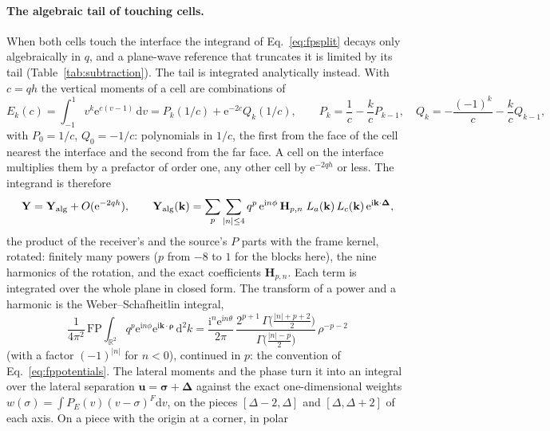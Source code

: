 \documentclass[11pt,a4paper]{article}
\newcommand{\bk}{\mathbf{k}}
\newcommand{\brho}{\boldsymbol{\rho}}
\newcommand{\dd}{\mathrm{d}}
\newcommand{\ii}{\mathrm{i}}
\newcommand{\ee}{\mathrm{e}}
\begin{document}
\paragraph{The algebraic tail of touching cells.} When both cells touch the interface the integrand of
Eq.~\eqref{eq:fpsplit} decays only algebraically in $q$, and a plane-wave reference that truncates it is limited
by its tail (Table~\ref{tab:subtraction}). The tail is integrated analytically instead. With $c=qh$ the vertical
moments of a cell are combinations of
\begin{equation}\label{eq:verticalsplit}
  E_k(c)=\int_{-1}^{1}v^k\ee^{c(v-1)}\,\dd v=P_k(1/c)+\ee^{-2c}Q_k(1/c),\qquad
  P_k=\frac1c-\frac kcP_{k-1},\quad Q_k=-\frac{(-1)^k}{c}-\frac kcQ_{k-1},
\end{equation}
with $P_0=1/c$, $Q_0=-1/c$: polynomials in $1/c$, the first from the face of the cell nearest the interface and
the second from the far face. A cell on the interface multiplies them by a prefactor of order one, any other
cell by $\ee^{-2qh}$ or less. The integrand is therefore
\begin{equation}\label{eq:yalg}
  \mathbf Y=\mathbf Y_{\rm alg}+O(\ee^{-2qh}),\qquad
  \mathbf Y_{\rm alg}(\bk)=\sum_{p}\sum_{|n|\le4}q^{p}\,\ee^{\ii n\phi}\,\mathbf H_{p,n}\;
  L_a(\bk)\,L_c(\bk)\,\ee^{\ii\bk\cdot\boldsymbol\Delta},
\end{equation}
the product of the receiver's and the source's $P$ parts with the frame kernel, rotated: finitely many powers
($p$ from $-8$ to $1$ for the blocks here), the nine harmonics of the rotation, and the exact coefficients
$\mathbf H_{p,n}$. Each term is integrated over the whole plane in closed form. The transform of a power and a
harmonic is the Weber--Schafheitlin integral,
\begin{equation}\label{eq:weberschafheitlin}
  \frac{1}{4\pi^2}\,\mathrm{FP}\!\int_{\mathbb R^2}q^{p}\ee^{\ii n\phi}\ee^{\ii\bk\cdot\brho}\,\dd^2k
  =\frac{\ii^{n}\ee^{\ii n\theta}}{2\pi}\,
  \frac{2^{p+1}\,\Gamma\bigl(\tfrac{|n|+p+2}{2}\bigr)}{\Gamma\bigl(\tfrac{|n|-p}{2}\bigr)}\,\rho^{-p-2}
\end{equation}
(with a factor $(-1)^{|n|}$ for $n<0$), continued in $p$: the convention of Eq.~\eqref{eq:fppotentials}. The
lateral moments and the phase turn it into an integral over the lateral separation $\mathbf u=\boldsymbol\sigma
+\boldsymbol\Delta$ against the exact one-dimensional weights $w(\sigma)=\int P_E(v)(v-\sigma)^F\dd v$, on the
pieces $[\Delta-2,\Delta]$ and $[\Delta,\Delta+2]$ of each axis. On a piece with the origin at a corner, in polar
\end{document}
